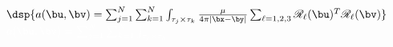 $$
\begin{array}{l}
\dsp{ a(\bu,\bv) = \sum_{j=1}^{N}\sum_{k=1}^{N}\int_{\tau_{j}\times\tau_{k}}\frac{\mu}{4\pi\vert\bx-\by\vert}
\sum_{\ell=1,2,3}\mathscr{R}_{\ell}(\bu)^{T}\mathscr{R}_{\ell}(\bv)}\\
\textcolor{white}{ a(\bu,\bv) = \sum_{j=1}^{N}\sum_{k=1}^{N}\int_{\tau_{j}\times\tau_{k}} }
\end{array}
$$ 